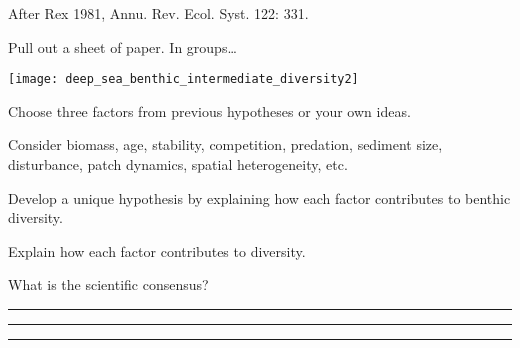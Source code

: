 \documentclass[t]{beamer}
\begin{document}
{
\begin{frame}[b]

\hfill\tiny After Rex 1981, Annu. Rev. Ecol. Syst. 122: 331.
\end{frame}}



%
%
%	
%
%

\begin{frame}[t]{Pull out a sheet of paper. In groups\dots}

	\vspace*{-\baselineskip}

	\begin{multicols}{2}

	\texttt{[image: deep\_sea\_benthic\_intermediate\_diversity2]}

	\columnbreak
	
	\hangpara Choose three factors from previous hypotheses or your own ideas.
	
	\hangpara Consider biomass, age, stability, competition, predation, sediment size, disturbance, patch dynamics, spatial heterogeneity, etc.

	\hangpara Develop a unique hypothesis by explaining how each factor contributes to benthic diversity. 
	
	\hangpara Explain how each factor contributes to diversity. 

	\end{multicols}

\end{frame}


\begin{frame}[t]{What is the scientific consensus?}

\hangpara \rule{2.5in}{0.4pt}

\vspace*{2\baselineskip}

\hangpara \rule{2.5in}{0.4pt}

\vspace*{2\baselineskip}

\hangpara \rule{2.5in}{0.4pt}

\end{frame}
\end{document}
